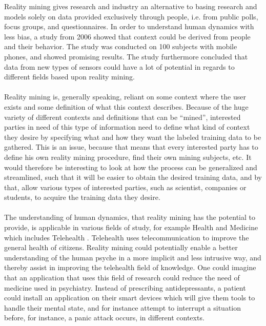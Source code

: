 
Reality mining gives research and industry an alternative to basing research and models solely on data provided exclusively through people, i.e. from public polls, focus groups, and questionnaires. In order to understand human dynamics with less bias, a study from 2006 \parencite{eagle2006_reality_mining_definition} showed that context could be derived from people and their behavior. The study was conducted on 100 subjects with mobile phones, and showed promising results. The study furthermore concluded that data from new types of sensors could have a lot of potential in regards to different fields based upon reality mining. 
\\\\
Reality mining is, generally speaking, reliant on some context where the user exists and some definition of what this context describes. Because of the huge variety of different contexts and definitions that can be ``mined'', interested parties in need of this type of information need to define what kind of context they desire by specifying what and how they want the labeled training data to be gathered. This is an issue, because that means that every interested party has to define his own reality mining procedure, find their own mining subjects, etc. It would therefore be interesting to look at how the process can be generalized and streamlined, such that it will be easier to obtain the desired training data, and by that, allow various types of interested parties, such as scientist, companies or students, to acquire the training data they desire.
\\\\
The understanding of human dynamics, that reality mining has the potential to provide, is applicable in various fields of study, for example Health and Medicine \parencite{pentland2009_reality_mining_health_medicine} which includes Telehealth \parencite{telehealth_aau}. Telehealth uses telecommunication to improve the general health of citizens. Reality mining could potentially enable a better understanding of the human psyche in a more implicit and less intrusive way, and thereby assist in improving the telehealth field of knowledge. One could imagine that an application that uses this field of research could reduce the need of medicine used in psychiatry. Instead of prescribing antidepressants, a patient could install an application on their smart devices which will give them tools to handle their mental state, and for instance attempt to interrupt a situation before, for instance, a panic attack occurs, in different contexts. 
